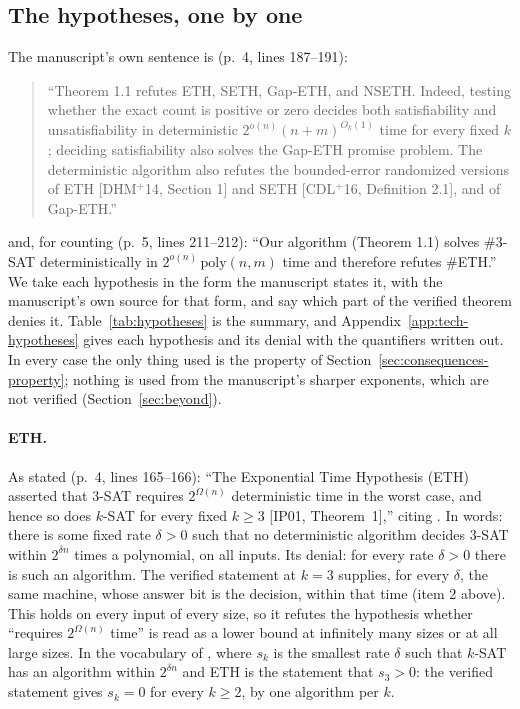 \subsection{The hypotheses, one by one}
\label{sec:consequences-hypotheses}

The manuscript's own sentence is (p.~4, lines 187--191):
\begin{quote}\small
``Theorem 1.1 refutes ETH, SETH, Gap-ETH, and NSETH. Indeed, testing
whether the exact count is positive or zero decides both satisfiability
and unsatisfiability in deterministic $2^{o(n)}(n+m)^{O_k(1)}$ time for
every fixed $k$; deciding satisfiability also solves the Gap-ETH promise
problem. The deterministic algorithm also refutes the bounded-error
randomized versions of ETH [DHM$^+$14, Section 1] and SETH [CDL$^+$16,
Definition 2.1], and of Gap-ETH.''
\end{quote}
and, for counting (p.~5, lines 211--212): ``Our algorithm (Theorem 1.1)
solves \#3-SAT deterministically in $2^{o(n)}\,\mathrm{poly}(n,m)$ time
and therefore refutes \#ETH.'' We take each hypothesis in the form the
manuscript states it, with the manuscript's own source for that form,
and say which part of the verified theorem denies it.
Table~\ref{tab:hypotheses} is the summary, and
Appendix~\ref{app:tech-hypotheses} gives each hypothesis and its denial
with the quantifiers written out. In every case the only thing used is
the property of Section~\ref{sec:consequences-property}; nothing is used
from the manuscript's sharper exponents, which are not verified
(Section~\ref{sec:beyond}).

\paragraph{ETH.}
As stated (p.~4, lines 165--166): ``The Exponential Time Hypothesis (ETH)
asserted that 3-SAT requires $2^{\Omega(n)}$ deterministic time in the
worst case, and hence so does $k$-SAT for every fixed $k \ge 3$ [IP01,
Theorem~1],'' citing \citet{ImpagliazzoPaturi2001}. In words: there is
some fixed rate $\delta > 0$ such that no deterministic algorithm decides
3-SAT within $2^{\delta n}$ times a polynomial, on all inputs. Its
denial: for every rate $\delta > 0$ there is such an algorithm. The
verified statement at $k = 3$ supplies, for every $\delta$, the same
machine, whose answer bit is the decision, within that time (item 2
above). This holds on every input of every size, so it refutes the
hypothesis whether ``requires $2^{\Omega(n)}$ time'' is read as a lower
bound at infinitely many sizes or at all large sizes. In the vocabulary
of \citet{ImpagliazzoPaturi2001}, where $s_k$ is the smallest rate $\delta$ such that $k$-SAT has an algorithm within $2^{\delta n}$ and ETH is the statement that $s_3 > 0$: the verified statement gives $s_k = 0$
for every $k \ge 2$, by one algorithm per $k$.

